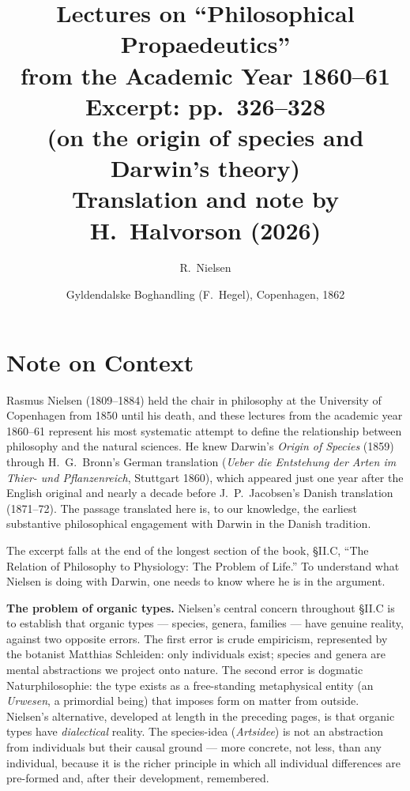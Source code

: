 \documentclass[12pt,a4paper]{article}
\title{\textbf{Lectures on ``Philosophical Propaedeutics''}\\[0.4em]
\large from the Academic Year 1860--61\\[0.3em]
\normalsize Excerpt: pp.\ 326--328\\
(on the origin of species and Darwin's theory)\\[0.6em]
\small Translation and note by H.\ Halvorson (2026)}
\author{R.\ Nielsen}
\date{Gyldendalske Boghandling (F.\ Hegel), Copenhagen, 1862}
\begin{document}
\maketitle
\thispagestyle{fancy}


\section*{Note on Context}

Rasmus Nielsen (1809--1884) held the chair in philosophy at the
University of Copenhagen from 1850 until his death, and these
lectures from the academic year 1860--61 represent his most
systematic attempt to define the relationship between philosophy
and the natural sciences. He knew Darwin's \emph{Origin of
Species} (1859) through H.\ G.\ Bronn's German translation
(\emph{Ueber die Entstehung der Arten im Thier- und
Pflanzenreich}, Stuttgart 1860), which appeared just one year
after the English original and nearly a decade before J.\ P.\
Jacobsen's Danish translation (1871--72). The passage translated
here is, to our knowledge, the earliest substantive philosophical
engagement with Darwin in the Danish tradition.

The excerpt falls at the end of the longest section of the book,
§II.C, ``The Relation of Philosophy to Physiology: The Problem of
Life.'' To understand what Nielsen is doing with Darwin, one needs
to know where he is in the argument.

\medskip\noindent\textbf{The problem of organic types.} Nielsen's
central concern throughout §II.C is to establish that organic
types --- species, genera, families --- have genuine reality,
against two opposite errors. The first error is crude empiricism,
represented by the botanist Matthias Schleiden: only individuals
exist; species and genera are mental abstractions we project onto
nature. The second error is dogmatic Naturphilosophie: the type
exists as a free-standing metaphysical entity (an
\emph{Urwesen}, a primordial being) that imposes form on
matter from outside. Nielsen's alternative, developed at length in
the preceding pages, is that organic types have \emph{dialectical}
reality. The species-idea (\emph{Artsidee}) is not an abstraction
from individuals but their causal ground --- more concrete, not
less, than any individual, because it is the richer principle in
which all individual differences are pre-formed and, after their
development, remembered.
\end{document}

